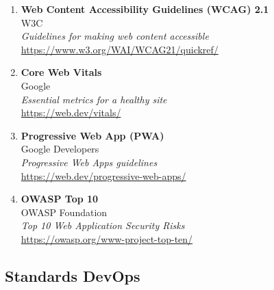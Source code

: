 \begin{enumerate}
    \item \textbf{Web Content Accessibility Guidelines (WCAG) 2.1} \\
    W3C \\
    \textit{Guidelines for making web content accessible} \\
    \url{https://www.w3.org/WAI/WCAG21/quickref/}

    \item \textbf{Core Web Vitals} \\
    Google \\
    \textit{Essential metrics for a healthy site} \\
    \url{https://web.dev/vitals/}

    \item \textbf{Progressive Web App (PWA)} \\
    Google Developers \\
    \textit{Progressive Web Apps guidelines} \\
    \url{https://web.dev/progressive-web-apps/}

    \item \textbf{OWASP Top 10} \\
    OWASP Foundation \\
    \textit{Top 10 Web Application Security Risks} \\
    \url{https://owasp.org/www-project-top-ten/}
\end{enumerate}

\subsection{Standards DevOps}

